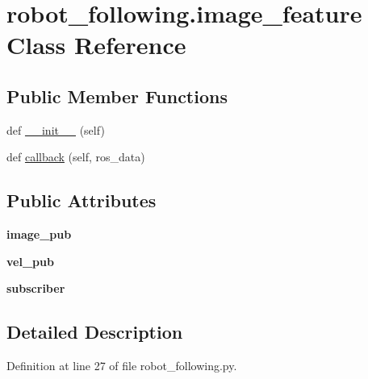 \hypertarget{classrobot__following_1_1image__feature}{}\section{robot\+\_\+following.\+image\+\_\+feature Class Reference}
\label{classrobot__following_1_1image__feature}
\subsection*{Public Member Functions}
\begin{DoxyCompactItemize}
\item 
def \hyperlink{classrobot__following_1_1image__feature_ad21c13434a4653ea1a64fb00a742a3ae}{\+\_\+\+\_\+init\+\_\+\+\_\+} (self)
\item 
def \hyperlink{classrobot__following_1_1image__feature_af3eddd8a93175ab03651d9ea0352ab56}{callback} (self, ros\+\_\+data)
\end{DoxyCompactItemize}
\subsection*{Public Attributes}
\begin{DoxyCompactItemize}
\item 
{\bfseries image\+\_\+pub}\hypertarget{classrobot__following_1_1image__feature_a1246d1d342e919f2f2a00d3f8f887245}{}\label{classrobot__following_1_1image__feature_a1246d1d342e919f2f2a00d3f8f887245}

\item 
{\bfseries vel\+\_\+pub}\hypertarget{classrobot__following_1_1image__feature_a745a8de4e922b376f83df74a882d7d2a}{}\label{classrobot__following_1_1image__feature_a745a8de4e922b376f83df74a882d7d2a}

\item 
{\bfseries subscriber}\hypertarget{classrobot__following_1_1image__feature_a08612a4f188d867aca7844e1e30fb44e}{}\label{classrobot__following_1_1image__feature_a08612a4f188d867aca7844e1e30fb44e}

\end{DoxyCompactItemize}


\subsection{Detailed Description}


Definition at line 27 of file robot\+\_\+following.\+py.



